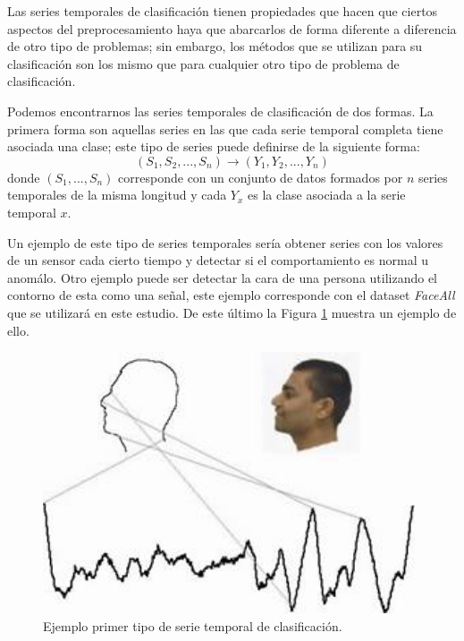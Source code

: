 Las series temporales de clasificación tienen propiedades que hacen que ciertos aspectos del preprocesamiento haya que abarcarlos de forma diferente a diferencia de otro tipo de problemas; sin embargo, los métodos que se utilizan para su clasificación son los mismo que para cualquier otro tipo de problema de clasificación.\newline

Podemos encontrarnos las series temporales de clasificación de dos formas. La primera forma son aquellas series en las que cada serie temporal completa tiene asociada una clase; este tipo de series puede definirse de la siguiente forma:\newline
$$ (S_1, S_2 ,..., S_n) \rightarrow (Y_1, Y_2, ..., Y_n) $$
\noindent donde $(S_1, ..., S_n)$ corresponde con un conjunto de datos formados por $n$ series temporales de la misma longitud y cada $Y_x$ es la clase asociada a la serie temporal $x$.\newline

Un ejemplo de este tipo de series temporales sería obtener series con los valores de un sensor cada cierto tiempo y detectar si el comportamiento es normal u anomálo. Otro ejemplo puede ser detectar la cara de una persona utilizando el contorno de esta como una señal, este ejemplo corresponde con el dataset \textit{FaceAll} que se utilizará en este estudio. De este último la Figura \ref{fig:face_all_fig} muestra un ejemplo de ello.\newline

\begin{figure}[H]
	\centering
	\includegraphics[width=110mm]{imagenes/facell_all_example.jpg}
	\caption{Ejemplo primer tipo de serie temporal de clasificación.}
	\label{fig:face_all_fig}
\end{figure}
\verticalspace

